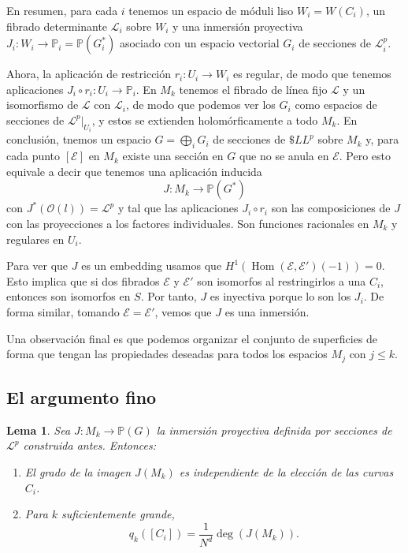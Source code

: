 \documentclass[12pt, a4paper]{amsart}
\newcommand\PP{\mathbb{P}}
\newcommand\EE{\mathscr{E}}
\newcommand\LL{\mathscr{L}}
\newcommand\OO{\mathscr{O}}
\DeclareMathOperator\Hom{Hom}
\newtheorem{lema}[thm]{Lema}
\theoremstyle{remark} \newtheorem{rmk}[thm]{Observación}
\theoremstyle{remark} \newtheorem{rmks}[thm]{Observaciones}
\theoremstyle{definition} \newtheorem{defn}[thm]{Definición}
\theoremstyle{definition} \newtheorem{ejs}[thm]{Ejemplos}
\theoremstyle{definition} \newtheorem{ej}[thm]{Ejemplo}
\begin{document}
En resumen, para cada $i$ tenemos un espacio de móduli liso $W_i=W(C_i)$, un fibrado determinante $\LL_i$ sobre $W_i$ y una inmersión proyectiva $J_i:W_i \rightarrow \PP_i=\PP(G_i^*)$ asociado con un espacio vectorial $G_i$ de secciones de $\LL^p_i$.

Ahora, la aplicación de restricción  $r_i:U_i\rightarrow W_i$ es regular, de modo que tenemos aplicaciones $J_i\circ r_i: U_i \rightarrow \PP_i$. En $M_k$ tenemos el fibrado de línea fijo $\LL$ y un isomorfismo de $\LL$ con $\LL_i$, de modo que podemos ver los $G_i$ como espacios de secciones de $\LL^p|_{U_i}$, y estos se extienden holomórficamente a todo $M_k$. En conclusión, tnemos un espacio $G=\bigoplus_i G_i$ de secciones de $\$LL^p$ sobre $M_k$ y, para cada punto $[\EE]$ en $M_k$ existe una sección en $G$ que no se anula en $\EE$. Pero esto equivale a decir que tenemos una aplicación inducida
\begin{equation*}
	J: M_k \rightarrow \PP(G^*)
\end{equation*} 
con $J^*(\OO(l))=\LL^p$ y tal que las aplicaciones $J_i\circ r_i$ son las composiciones de $J$ con las proyecciones a los factores individuales. Son funciones racionales en $M_k$ y regulares en $U_i$.

Para ver que $J$ es un embedding usamos que $H^1(\Hom(\EE,\EE')(-1))=0$. Esto implica que si dos fibrados $\EE$ y $\EE'$ son isomorfos al restringirlos a una $C_i$, entonces son isomorfos en $S$. Por tanto, $J$ es inyectiva porque lo son los $J_i$. De forma similar, tomando $\EE=\EE'$, vemos que $J$ es una inmersión. 

Una observación final es que podemos organizar el conjunto de superficies de forma que tengan las propiedades deseadas para todos los espacios $M_j$ con $j\leq k$.

\subsection{El argumento fino}

\begin{lema}
Sea $J:M_k \rightarrow \PP(G)$ la inmersión proyectiva definida por secciones de $\LL^p$ construida antes. Entonces:
	\begin{enumerate}
		\item  El grado de la imagen $J(M_k)$ es independiente de la elección de las curvas $C_i$.
		\item Para $k$ suficientemente grande, 
			\begin{equation*}
				q_k([C_i])=\frac{1}{N^d} \deg(J(M_k)).
			\end{equation*} 
	\end{enumerate}
\end{lema}
\end{document}
